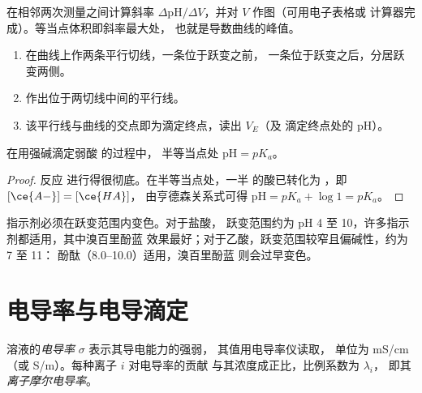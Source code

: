 \begin{method}[导数法]\label{met:g12:ph-conductivity-titrations:derivative}
在相邻两次测量之间计算斜率
$\Delta\mathrm{pH}/\Delta V$，并对 $V$ 作图（可用电子表格或
计算器完成）。等当点体积即斜率最大处，
也就是导数曲线的峰值。
\end{method}

\begin{method}[切线法]\label{met:g12:ph-conductivity-titrations:tangent}
\begin{enumerate}
  \item 在曲线上作两条平行切线，一条位于跃变之前，
        一条位于跃变之后，分居跃变两侧。
  \item 作出位于两切线中间的平行线。
  \item 该平行线与曲线的交点即为滴定终点，读出 $V_E$（及
        滴定终点处的 pH）。
\end{enumerate}
\end{method}

\begin{proposition}[半等当点处，$\mathrm{pH} = pK_a$]\label{prop:g12:ph-conductivity-titrations:half}
在用强碱滴定弱酸  的过程中，
半等当点处 $\mathrm{pH} = pK_a$。
\end{proposition}

\begin{proof}
反应  进行得很彻底。在半等当点处，一半
的酸已转化为 ，即 $[\ce{A-}] = [\ce{HA}]$，
由亨德森关系式可得 $\mathrm{pH} = pK_a + \log 1 = pK_a$。
\end{proof}

\begin{remark}[从曲线选择指示剂]\label{rem:g12:ph-conductivity-titrations:indicator}
指示剂必须在跃变范围内变色。对于盐酸，
跃变范围约为 pH 4 至 10，许多指示剂都适用，其中溴百里酚蓝
效果最好；对于乙酸，跃变范围较窄且偏碱性，约为 7 至 11：
酚酞（8.0--10.0）适用，溴百里酚蓝
则会过早变色。
\end{remark}

\section{电导率与电导滴定}

\begin{definition}\label{def:g12:ph-conductivity-titrations:conductivity}
溶液的\emph{电导率} $\sigma$ 表示其导电能力的强弱，
其值用电导率仪读取，
单位为 \si{mS/cm}（或 \si{S/m}）。每种离子 $i$ 对电导率的贡献
与其浓度成正比，比例系数为 $\lambda_i$，
即其\emph{离子摩尔电导率}。
\end{definition}

